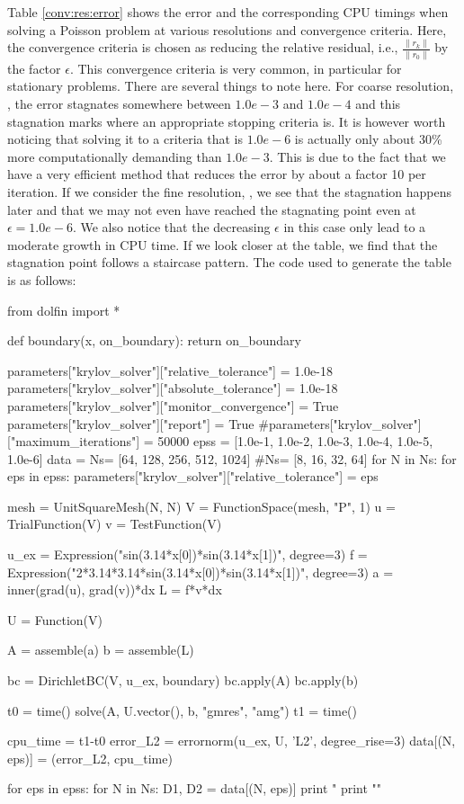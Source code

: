 Table \ref{conv:res:error} shows the error and the corresponding CPU timings when solving a Poisson problem
at various resolutions and convergence criteria. 
Here, the convergence criteria is chosen as reducing the relative residual, i.e., $\frac{\|r_k\|}{\|r_0\|}$
by the factor $\epsilon$. This convergence criteria is very common, in particular for stationary problems.  
There are several things to note here. For coarse resolution, , the error stagnates somewhere
between $1.0e-3$ and $1.0e-4$ and this stagnation marks where an appropriate stopping criteria is.   
It is however worth noticing that solving it to a criteria that is 
$1.0e-6$ is actually only about 30\% more computationally demanding than $1.0e-3$. This is due to the
fact that we have a very efficient method that reduces the error by about a factor 10 per iteration.   
If we consider the fine resolution, , we see that the stagnation happens later and that
we may not even have reached the stagnating point even at $\epsilon=1.0e-6$. We also notice that 
the decreasing $\epsilon$ in this case only lead to a moderate growth in CPU time.   
If we look closer at the table, we find that the stagnation point follows a staircase pattern. 
The code used to generate the table is as follows: 

\begin{python}
from dolfin import *

def boundary(x, on_boundary):
    return on_boundary

parameters["krylov_solver"]["relative_tolerance"] = 1.0e-18 
parameters["krylov_solver"]["absolute_tolerance"] = 1.0e-18 
parameters["krylov_solver"]["monitor_convergence"] = True 
parameters["krylov_solver"]["report"] = True 
#parameters["krylov_solver"]["maximum_iterations"] = 50000 
epss = [1.0e-1, 1.0e-2, 1.0e-3, 1.0e-4, 1.0e-5, 1.0e-6]
data = {}
Ns= [64, 128, 256, 512, 1024]
#Ns= [8, 16, 32, 64]
for N in Ns:
  for eps in epss:  
    parameters["krylov_solver"]["relative_tolerance"] = eps 

    mesh = UnitSquareMesh(N, N)
    V = FunctionSpace(mesh, "P", 1)
    u = TrialFunction(V)
    v = TestFunction(V)

    u_ex = Expression("sin(3.14*x[0])*sin(3.14*x[1])", degree=3) 
    f = Expression("2*3.14*3.14*sin(3.14*x[0])*sin(3.14*x[1])", degree=3) 
    a = inner(grad(u), grad(v))*dx  
    L = f*v*dx 

    U = Function(V)

    A = assemble(a) 
    b = assemble(L)

    bc = DirichletBC(V, u_ex, boundary)
    bc.apply(A)
    bc.apply(b) 

    t0 = time()
    solve(A, U.vector(), b, "gmres", "amg")
    t1 = time()

    cpu_time = t1-t0
    error_L2 = errornorm(u_ex, U, 'L2', degree_rise=3)
    data[(N, eps)] = (error_L2, cpu_time) 

for eps in epss:  
  for N in Ns:
    D1, D2 = data[(N, eps)]
    print " %
    print ""
	
\end{python}

